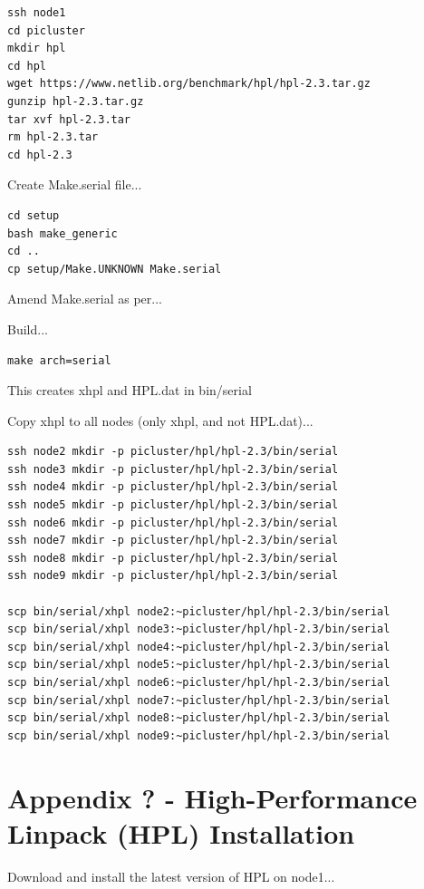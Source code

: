 \documentclass{article}
\begin{document}
\begin{lstlisting}[]
ssh node1
cd picluster
mkdir hpl
cd hpl
wget https://www.netlib.org/benchmark/hpl/hpl-2.3.tar.gz
gunzip hpl-2.3.tar.gz
tar xvf hpl-2.3.tar
rm hpl-2.3.tar
cd hpl-2.3
\end{lstlisting}

Create Make.serial file...

\begin{lstlisting}[]
cd setup
bash make_generic
cd ..
cp setup/Make.UNKNOWN Make.serial
\end{lstlisting}

Amend Make.serial as per...

Build...

\begin{lstlisting}[]
make arch=serial   
\end{lstlisting}

This creates xhpl and HPL.dat in bin/serial

Copy xhpl to all nodes (only xhpl, and not HPL.dat)...

\begin{lstlisting}[]
ssh node2 mkdir -p picluster/hpl/hpl-2.3/bin/serial
ssh node3 mkdir -p picluster/hpl/hpl-2.3/bin/serial
ssh node4 mkdir -p picluster/hpl/hpl-2.3/bin/serial
ssh node5 mkdir -p picluster/hpl/hpl-2.3/bin/serial
ssh node6 mkdir -p picluster/hpl/hpl-2.3/bin/serial
ssh node7 mkdir -p picluster/hpl/hpl-2.3/bin/serial
ssh node8 mkdir -p picluster/hpl/hpl-2.3/bin/serial
ssh node9 mkdir -p picluster/hpl/hpl-2.3/bin/serial

scp bin/serial/xhpl node2:~picluster/hpl/hpl-2.3/bin/serial
scp bin/serial/xhpl node3:~picluster/hpl/hpl-2.3/bin/serial
scp bin/serial/xhpl node4:~picluster/hpl/hpl-2.3/bin/serial
scp bin/serial/xhpl node5:~picluster/hpl/hpl-2.3/bin/serial
scp bin/serial/xhpl node6:~picluster/hpl/hpl-2.3/bin/serial
scp bin/serial/xhpl node7:~picluster/hpl/hpl-2.3/bin/serial
scp bin/serial/xhpl node8:~picluster/hpl/hpl-2.3/bin/serial
scp bin/serial/xhpl node9:~picluster/hpl/hpl-2.3/bin/serial
\end{lstlisting}


%
%
\clearpage\section{Appendix ? - High-Performance Linpack (HPL) Installation}

Download and install the latest version of HPL on node1...
\end{document}
